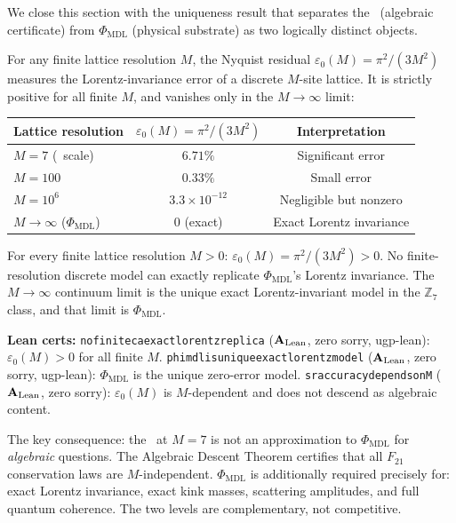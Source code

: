 \documentclass[11pt,openany]{book}
\theoremstyle{remark}
\newcommand{\PHIMDL}{\Phi_{\mathrm{MDL}}}
\newcommand{\ZS}{\mathbb{Z}_7}
\newcommand{\lean}[1]{%
  \penalty-100
  \begingroup\def\_{\textunderscore\allowbreak}\texttt{#1}\endgroup}
\newcommand{\CMCA}{\text{CMCA}}
\newcommand{\CatAL}{\ensuremath{\textbf{A}_{\rm Lean}}}
\begin{document}
We close this section with the uniqueness result that separates the \CMCA\ (algebraic
certificate) from $\PHIMDL$ (physical substrate) as two logically distinct objects.

For any finite lattice resolution $M$, the Nyquist residual
$\varepsilon_0(M) = \pi^2/(3M^2)$ measures the Lorentz-invariance error of a
discrete $M$-site lattice.
It is strictly positive for all finite $M$, and vanishes only in the $M\to\infty$ limit:

\begin{center}
\begin{tabular}{@{}lcc@{}}
\toprule
Lattice resolution & $\varepsilon_0(M) = \pi^2/(3M^2)$ & Interpretation \\
\midrule
$M=7$ (\CMCA\ scale) & $6.71\%$ & Significant error \\
$M=100$ & $0.33\%$ & Small error \\
$M=10^6$ & $3.3\times10^{-12}$ & Negligible but nonzero \\
$M\to\infty$ ($\PHIMDL$) & $0$ (exact) & Exact Lorentz invariance \\
\bottomrule
\end{tabular}
\end{center}

\begin{tcolorbox}[colback=orange!5,colframe=orange!60,
  title={Theorem: No-CA-Replica and $\PHIMDL$ Uniqueness (\CatAL)}]
For every finite lattice resolution $M>0$:
$\varepsilon_0(M) = \pi^2/(3M^2) > 0$.
No finite-resolution discrete model can exactly replicate $\PHIMDL$'s Lorentz invariance.
The $M\to\infty$ continuum limit is the unique exact Lorentz-invariant model
in the $\ZS$ class, and that limit is $\PHIMDL$.

\smallskip\noindent
\textbf{Lean certs:}
\lean{no\_finite\_ca\_exact\_lorentz\_replica} (\CatAL, zero sorry, ugp-lean):
$\varepsilon_0(M) > 0$ for all finite $M$.
\lean{phimdl\_is\_unique\_exact\_lorentz\_model} (\CatAL, zero sorry, ugp-lean):
$\PHIMDL$ is the unique zero-error model.
\lean{sr\_accuracy\_depends\_on\_M} (\CatAL, zero sorry): $\varepsilon_0(M)$ is
$M$-dependent and does not descend as algebraic content.
\end{tcolorbox}

The key consequence: the \CMCA\ at $M=7$ is not an approximation to $\PHIMDL$ for
\emph{algebraic} questions.
The Algebraic Descent Theorem certifies that all $F_{21}$ conservation laws are
$M$-independent.
$\PHIMDL$ is additionally required precisely for: exact Lorentz invariance, exact
kink masses, scattering amplitudes, and full quantum coherence.
The two levels are complementary, not competitive.
\end{document}
